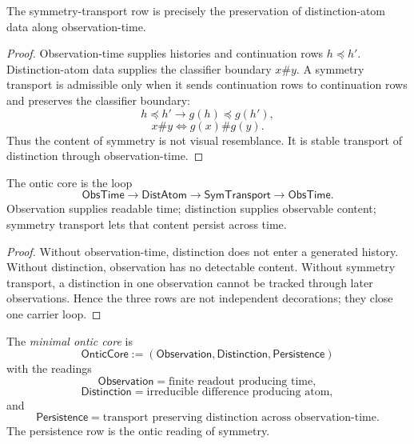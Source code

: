 \begin{theorem}
\label{thm:unified-reality-symmetry-distinction-through-time}
The symmetry-transport row is precisely the preservation of
distinction-atom data along observation-time.
\end{theorem}

\begin{proof}
Observation-time supplies histories and continuation rows
$h\preceq h'$. Distinction-atom data supplies the classifier boundary
$x\# y$. A symmetry transport is admissible only when it sends
continuation rows to continuation rows and preserves the classifier
boundary:
$$
h\preceq h'
\to
g(h)\preceq g(h'),
$$
$$
x\# y
\Longleftrightarrow
g(x)\# g(y).
$$
Thus the content of symmetry is not visual resemblance. It is stable
transport of distinction through observation-time.
\end{proof}

\begin{corollary}
\label{cor:unified-reality-observation-distinction-persistence-loop}
The ontic core is the loop
$$
\mathsf{ObsTime}
\to
\mathsf{DistAtom}
\to
\mathsf{SymTransport}
\to
\mathsf{ObsTime}.
$$
Observation supplies readable time; distinction supplies observable
content; symmetry transport lets that content persist across time.
\end{corollary}

\begin{proof}
Without observation-time, distinction does not enter a generated
history. Without distinction, observation has no detectable content.
Without symmetry transport, a distinction in one observation cannot be
tracked through later observations. Hence the three rows are not
independent decorations; they close one carrier loop.
\end{proof}

\begin{definition}
\label{def:unified-reality-minimal-ontic-core}
The \emph{minimal ontic core} is
$$
\mathsf{OnticCore}
:=
(\mathsf{Observation},\mathsf{Distinction},\mathsf{Persistence})
$$
with the readings
$$
\mathsf{Observation}
=
\text{finite readout producing time},
$$
$$
\mathsf{Distinction}
=
\text{irreducible difference producing atom},
$$
and
$$
\mathsf{Persistence}
=
\text{transport preserving distinction across observation-time}.
$$
The persistence row is the ontic reading of symmetry.
\end{definition}

